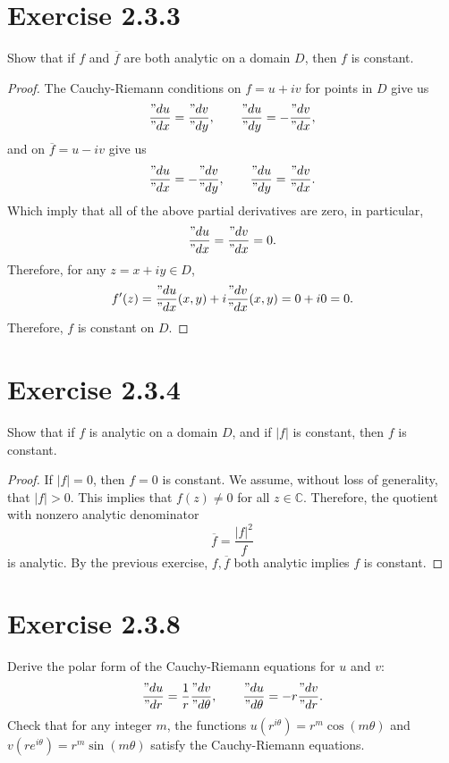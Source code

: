 \documentclass[12pt]{article}
\newenvironment{problem}
    {\begin{lrbox}{\mybox}\begin{minipage}{\textwidth-10pt}}
    {\end{minipage}\end{lrbox}\framebox[6.5in]{\usebox{\mybox}}}
\newcommand{\clo}[1]{\overline{#1}}
\newcommand{\conj}[1]{\overline{#1}}
\newcommand{\C}{\mathbb{C}}
\begin{document}
\section*{Exercise 2.3.3}
\begin{problem}
    Show that if $f$ and $\clo{f}$ are both analytic on a domain $D$, then $f$ is constant.
\end{problem}

\begin{proof}
    The Cauchy-Riemann conditions on $f=u+iv$  for points in $D$ give us
    \[\frac{"du}{"dx} = \frac{"dv}{"dy}, \qquad \frac{"du}{"dy} = -\frac{"dv}{"dx},\]
    and on $\conj{f} = u - iv$ give us
    \[\frac{"du}{"dx} = -\frac{"dv}{"dy}, \qquad \frac{"du}{"dy} = \frac{"dv}{"dx}.\]
    Which imply that all of the above partial derivatives are zero, in particular,
    \[\frac{"du}{"dx} = \frac{"dv}{"dx} = 0.\]
    Therefore, for any $z=x+iy\in D$,
    \[f'(z) = \frac{"du}{"dx}(x,y) + i\frac{"dv}{"dx}(x,y) = 0 + i0 = 0.\]
    Therefore, $f$ is constant on $D$.
    
\end{proof}

\section*{Exercise 2.3.4}
\begin{problem}
    Show that if $f$ is analytic on a domain $D$, and if $|f|$ is constant, then $f$ is constant.
\end{problem}

\begin{proof}
    If $|f|=0$, then $f=0$ is constant. We assume, without loss of generality, that $|f|>0$. This implies that $f(z)\ne 0$ for all $z\in\C$. Therefore, the quotient with nonzero analytic denominator
    \[\conj{f} = \frac{|f|^2}{f}\]
    is analytic. By the previous exercise, $f,\conj{f}$ both analytic implies $f$ is constant.
    
    
\end{proof}

\section*{Exercise 2.3.8}
\begin{problem}
    Derive the polar form of the Cauchy-Riemann equations for $u$ and $v$:
    \[\frac{"du}{"dr} = \frac1r \frac{"dv}{"d\theta}, \qquad \frac{"du}{"d\theta} = -r\frac{"dv}{"dr}.\]
    Check that for any integer $m$, the functions $u(r^{i\theta})=r^m\cos(m\theta)$ and $v(re^{i\theta}) = r^m\sin(m\theta)$ satisfy the Cauchy-Riemann equations.
\end{problem}
\end{document}

